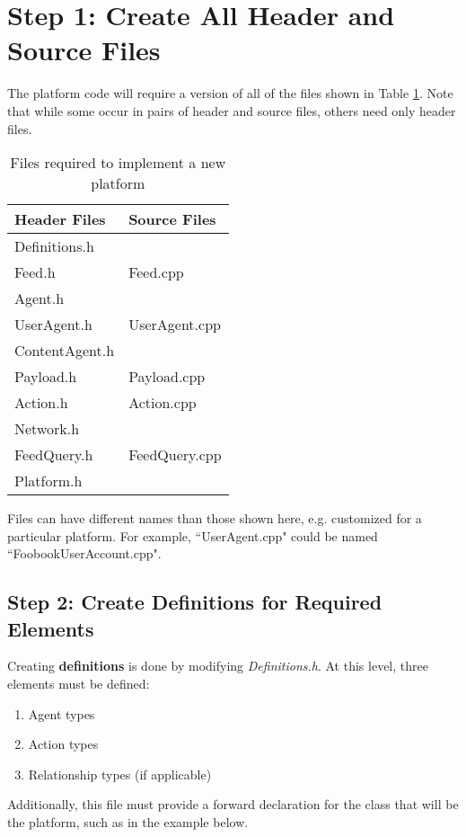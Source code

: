 \section{Step 1: Create All Header and Source Files}
The platform code will require a version of all of the files shown in Table \ref{table:PlatformRequiredFiles}. Note that while some occur in pairs of header and source files, others need only header files.

\begin{table}[H]
\begin{center}
\caption{Files required to implement a new platform}
\label{table:PlatformRequiredFiles}
\begin{tabular}{l | l}
\hline
 Header Files & Source Files \\
\hline
 Definitions.h & \\
 Feed.h & Feed.cpp \\
 Agent.h & \\
 UserAgent.h & UserAgent.cpp \\
 ContentAgent.h &  \\
 Payload.h & Payload.cpp \\
 Action.h & Action.cpp \\
 Network.h & \\	
 FeedQuery.h & FeedQuery.cpp \\
 Platform.h & \\
\end{tabular}
\end{center}
\end{table}

Files can have different names than those shown here, e.g. customized for a particular platform. For example, ``UserAgent.cpp" could be named ``FoobookUserAccount.cpp". 

\subsection{Step 2: Create Definitions for Required Elements}
Creating \textbf{definitions} is done by modifying \emph{Definitions.h}. At this level, three elements must be defined:

\begin{enumerate}
\item Agent types
\item Action types
\item Relationship types (if applicable)
\end{enumerate}

Additionally, this file must provide a forward declaration for the class that will be the platform, such as in the example below.

